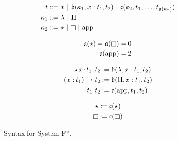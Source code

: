 
\begin{figure}
    \centering
    \begin{align*}
        t &::= x\ |\ \mathfrak{b}(\kappa_1, x : t_1, t_2)\ |\ \mathfrak{c}(\kappa_2, t_1, \ldots, t_{\mathfrak{a}(\kappa_2)}) \\
        \kappa_1 &::= \lambda\ |\ \Pi \\
        \kappa_2 &::=\star\ |\ \kind\ |\ \text{app} \\
    \end{align*}
    \vspace{-.6in}
    \begin{minipage}{0.32\textwidth}
        \begin{align*}
            \mathfrak{a}(\star) = \mathfrak{a}(\kind) &= 0 \\
            \mathfrak{a}(\text{app}) &= 2
        \end{align*}
    \end{minipage}%
    \begin{minipage}{0.32\textwidth}
        \begin{align*}
            {\lambda}\, x\! : \! t_1.\, t_2 &:= \mathfrak{b}(\lambda, x : t_1, t_2) \\
            (x : t_1) \to t_2 &:= \mathfrak{b}(\Pi, x : t_1, t_2) \\
            t_1\ t_2 &:= \mathfrak{c}(\text{app}, t_1, t_2)
        \end{align*}
    \end{minipage}%
    \begin{minipage}{0.32\textwidth}
        \begin{align*}
            \star &:= \mathfrak{c}(\star) \\
            \kind &:= \mathfrak{c}(\kind)
        \end{align*}
    \end{minipage}
    \caption{Syntax for System F$^\omega$.}
    \label{fig:syntax_f}
\end{figure}
